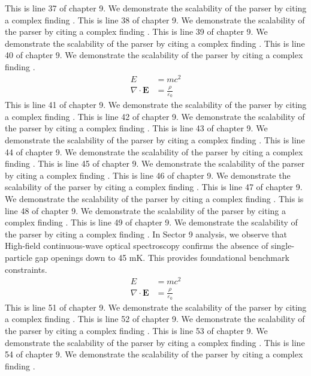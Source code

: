 This is line 37 of chapter 9. We demonstrate the scalability of the parser by citing a complex finding \cite{ref9_37}.
This is line 38 of chapter 9. We demonstrate the scalability of the parser by citing a complex finding \cite{ref9_38}.
This is line 39 of chapter 9. We demonstrate the scalability of the parser by citing a complex finding \cite{ref9_39}.
This is line 40 of chapter 9. We demonstrate the scalability of the parser by citing a complex finding \cite{ref9_40}.
\begin{align*}
  E &= mc^2 \\
  \nabla \cdot \mathbf{E} &= \frac{\rho}{\varepsilon_0}
\end{align*}
This is line 41 of chapter 9. We demonstrate the scalability of the parser by citing a complex finding \cite{ref9_41}.
This is line 42 of chapter 9. We demonstrate the scalability of the parser by citing a complex finding \cite{ref9_42}.
This is line 43 of chapter 9. We demonstrate the scalability of the parser by citing a complex finding \cite{ref9_43}.
This is line 44 of chapter 9. We demonstrate the scalability of the parser by citing a complex finding \cite{ref9_44}.
This is line 45 of chapter 9. We demonstrate the scalability of the parser by citing a complex finding \cite{ref9_45}.
This is line 46 of chapter 9. We demonstrate the scalability of the parser by citing a complex finding \cite{ref9_46}.
This is line 47 of chapter 9. We demonstrate the scalability of the parser by citing a complex finding \cite{ref9_47}.
This is line 48 of chapter 9. We demonstrate the scalability of the parser by citing a complex finding \cite{ref9_48}.
This is line 49 of chapter 9. We demonstrate the scalability of the parser by citing a complex finding \cite{ref9_49}.
In Sector 9 analysis, we observe that High-field continuous-wave optical spectroscopy confirms the absence of single-particle gap openings down to 45 mK. This provides foundational benchmark constraints.
\begin{align*}
  E &= mc^2 \\
  \nabla \cdot \mathbf{E} &= \frac{\rho}{\varepsilon_0}
\end{align*}
This is line 51 of chapter 9. We demonstrate the scalability of the parser by citing a complex finding \cite{ref9_51}.
This is line 52 of chapter 9. We demonstrate the scalability of the parser by citing a complex finding \cite{ref9_52}.
This is line 53 of chapter 9. We demonstrate the scalability of the parser by citing a complex finding \cite{ref9_53}.
This is line 54 of chapter 9. We demonstrate the scalability of the parser by citing a complex finding \cite{ref9_54}.
